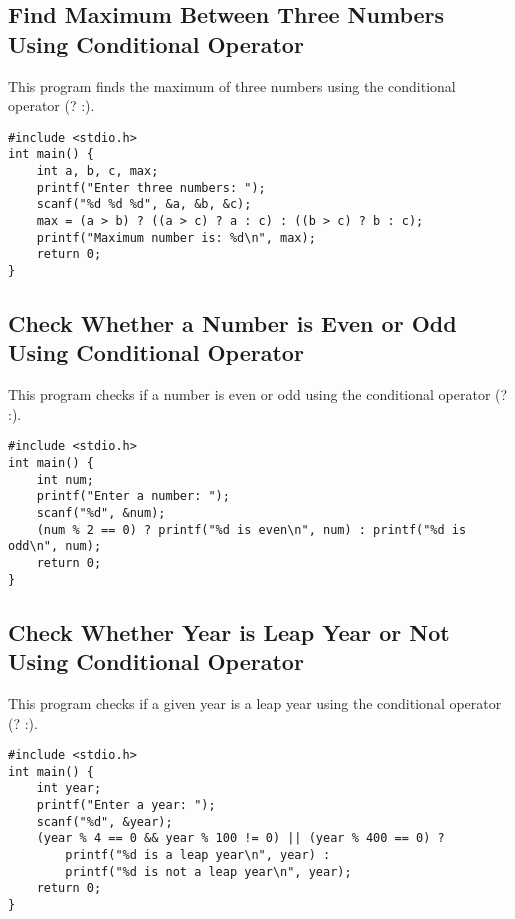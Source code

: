 \documentclass[a4paper,12pt]{article}
\begin{document}
\newpage

\subsection{Find Maximum Between Three Numbers Using Conditional Operator}
This program finds the maximum of three numbers using the conditional operator (? :).

\begin{lstlisting}[caption={Find Maximum Between Three Numbers Using Conditional Operator}]
#include <stdio.h>
int main() {
    int a, b, c, max;
    printf("Enter three numbers: ");
    scanf("%d %d %d", &a, &b, &c);
    max = (a > b) ? ((a > c) ? a : c) : ((b > c) ? b : c);
    printf("Maximum number is: %d\n", max);
    return 0;
}
\end{lstlisting}

\newpage

\subsection{Check Whether a Number is Even or Odd Using Conditional Operator}
This program checks if a number is even or odd using the conditional operator (? :).

\begin{lstlisting}[caption={Check Whether a Number is Even or Odd Using Conditional Operator}]
#include <stdio.h>
int main() {
    int num;
    printf("Enter a number: ");
    scanf("%d", &num);
    (num % 2 == 0) ? printf("%d is even\n", num) : printf("%d is odd\n", num);
    return 0;
}
\end{lstlisting}

\newpage

\subsection{Check Whether Year is Leap Year or Not Using Conditional Operator}
This program checks if a given year is a leap year using the conditional operator (? :).

\begin{lstlisting}[caption={Check Whether Year is Leap Year or Not Using Conditional Operator}]
#include <stdio.h>
int main() {
    int year;
    printf("Enter a year: ");
    scanf("%d", &year);
    (year % 4 == 0 && year % 100 != 0) || (year % 400 == 0) ?
        printf("%d is a leap year\n", year) :
        printf("%d is not a leap year\n", year);
    return 0;
}
\end{lstlisting}
\end{document}
